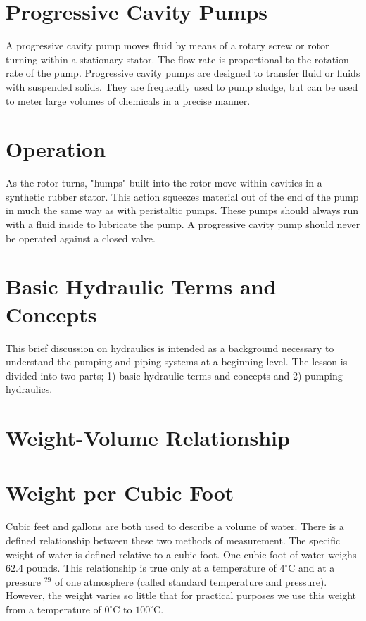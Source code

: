 \documentclass[10pt]{article}
\begin{document}
\section{Progressive Cavity Pumps}
A progressive cavity pump moves fluid by means of a rotary screw or rotor turning within a stationary stator. The flow rate is proportional to the rotation rate of the pump. Progressive cavity pumps are designed to transfer fluid or fluids with suspended solids. They are frequently used to pump sludge, but can be used to meter large volumes of chemicals in a precise manner.

\section{Operation}
As the rotor turns, "humps" built into the rotor move within cavities in a synthetic rubber stator. This action squeezes material out of the end of the pump in much the same way as with peristaltic pumps. These pumps should always run with a fluid inside to lubricate the pump. A progressive cavity pump should never be operated against a closed valve.

\section{Basic Hydraulic Terms and Concepts}
This brief discussion on hydraulics is intended as a background necessary to understand the pumping and piping systems at a beginning level. The lesson is divided into two parts; 1) basic hydraulic terms and concepts and 2) pumping hydraulics.

\section{Weight-Volume Relationship}
\section{Weight per Cubic Foot}
Cubic feet and gallons are both used to describe a volume of water. There is a defined relationship between these two methods of measurement. The specific weight of water is defined relative to a cubic foot. One cubic foot of water weighs $62.4$ pounds. This relationship is true only at a temperature of $4^{\circ} \mathrm{C}$ and at a pressure ${ }^{29}$ of one atmosphere (called standard temperature and pressure). However, the weight varies so little that for practical purposes we use this weight from a temperature of $0^{\circ} \mathrm{C}$ to $100^{\circ} \mathrm{C}$.
\end{document}
